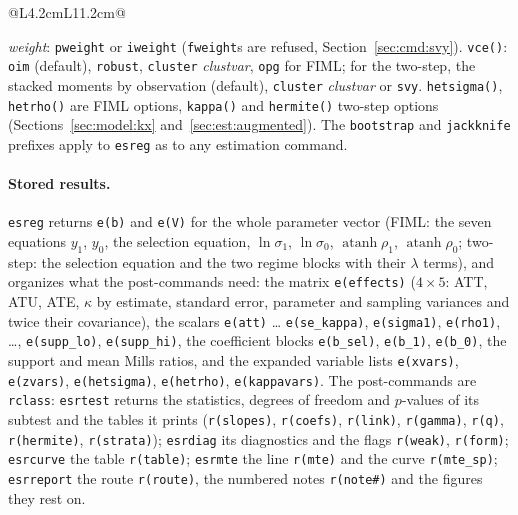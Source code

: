 \documentclass[11pt,a4paper]{article}
\theoremstyle{plain}
\theoremstyle{definition}
\theoremstyle{remark}
\newcommand{\1}{\mathbf{1}}
\newcommand{\cmd}[1]{\texttt{#1}}
\begin{document}
\begin{table}[!htb]
\begin{tabular}{@{}L{4.2cm}L{11.2cm}@{}}
\bottomrule
\end{tabular}
\parbox{0.95\textwidth}{\footnotesize \textit{weight}: \cmd{pweight} or \cmd{iweight} (\cmd{fweight}s are refused, Section~\ref{sec:cmd:svy}). \cmd{vce()}: \cmd{oim} (default), \cmd{robust}, \cmd{cluster} \textit{clustvar}, \cmd{opg} for FIML; for the two-step, the stacked moments by observation (default), \cmd{cluster} \textit{clustvar} or \cmd{svy}. \cmd{hetsigma()}, \cmd{hetrho()} are FIML options, \cmd{kappa()} and \cmd{hermite()} two-step options (Sections~\ref{sec:model:kx} and~\ref{sec:est:augmented}). The \cmd{bootstrap} and \cmd{jackknife} prefixes apply to \cmd{esreg} as to any estimation command.}
\end{table}

\paragraph{Stored results.}
\cmd{esreg} returns \cmd{e(b)} and \cmd{e(V)} for the whole parameter
vector (FIML: the seven equations $y_1$, $y_0$, the selection
equation, $\ln\sigma_1$, $\ln\sigma_0$, $\operatorname{atanh}\rho_1$,
$\operatorname{atanh}\rho_0$; two-step: the selection equation and
the two regime blocks with their $\lambda$ terms), and organizes what
the post-commands need: the matrix \cmd{e(effects)} ($4\times5$: ATT,
ATU, ATE, $\kappa$ by estimate, standard error, parameter and sampling
variances and twice their covariance), the scalars \cmd{e(att)} \ldots
\cmd{e(se\_kappa)}, \cmd{e(sigma1)}, \cmd{e(rho1)}, \ldots,
\cmd{e(supp\_lo)}, \cmd{e(supp\_hi)}, the coefficient blocks
\cmd{e(b\_sel)}, \cmd{e(b\_1)}, \cmd{e(b\_0)}, the support and mean
Mills ratios, and the expanded variable lists \cmd{e(xvars)},
\cmd{e(zvars)}, \cmd{e(hetsigma)}, \cmd{e(hetrho)}, \cmd{e(kappavars)}.
The post-commands are \cmd{rclass}: \cmd{esrtest} returns the
statistics, degrees of freedom and $p$-values of its subtest and the
tables it prints (\cmd{r(slopes)}, \cmd{r(coefs)}, \cmd{r(link)},
\cmd{r(gamma)}, \cmd{r(q)}, \cmd{r(hermite)}, \cmd{r(strata)});
\cmd{esrdiag} its diagnostics and the flags \cmd{r(weak)},
\cmd{r(form)}; \cmd{esrcurve} the table \cmd{r(table)}; \cmd{esrmte}
the line \cmd{r(mte)} and the curve \cmd{r(mte\_sp)}; \cmd{esrreport}
the route \cmd{r(route)}, the numbered notes \cmd{r(note\#)} and the
figures they rest on.
\end{document}
